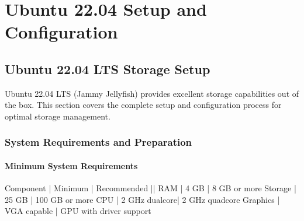 \documentclass[letterpaper,10pt,english]{sphinxmanual}
\begin{document}
\sphinxstepscope


\chapter{Ubuntu 22.04 Setup and Configuration}
\label{\detokenize{ubuntu-setup:ubuntu-22-04-setup-and-configuration}}\label{\detokenize{ubuntu-setup::doc}}

\section{Ubuntu 22.04 LTS Storage Setup}
\label{\detokenize{ubuntu-setup:ubuntu-22-04-lts-storage-setup}}
\sphinxAtStartPar
Ubuntu 22.04 LTS (Jammy Jellyfish) provides excellent storage capabilities out of the box. This section covers the complete setup and configuration process for optimal storage management.


\subsection{System Requirements and Preparation}
\label{\detokenize{ubuntu-setup:system-requirements-and-preparation}}

\subsubsection{Minimum System Requirements}
\label{\detokenize{ubuntu-setup:minimum-system-requirements}}
\begin{sphinxVerbatim}[commandchars=\\\{\}]
Component          | Minimum         | Recommended
\PYGZhy{}\PYGZhy{}\PYGZhy{}\PYGZhy{}\PYGZhy{}\PYGZhy{}\PYGZhy{}\PYGZhy{}\PYGZhy{}\PYGZhy{}\PYGZhy{}\PYGZhy{}\PYGZhy{}\PYGZhy{}\PYGZhy{}\PYGZhy{}\PYGZhy{}\PYGZhy{}\PYGZhy{}|\PYGZhy{}\PYGZhy{}\PYGZhy{}\PYGZhy{}\PYGZhy{}\PYGZhy{}\PYGZhy{}\PYGZhy{}\PYGZhy{}\PYGZhy{}\PYGZhy{}\PYGZhy{}\PYGZhy{}\PYGZhy{}\PYGZhy{}\PYGZhy{}\PYGZhy{}|\PYGZhy{}\PYGZhy{}\PYGZhy{}\PYGZhy{}\PYGZhy{}\PYGZhy{}\PYGZhy{}\PYGZhy{}\PYGZhy{}\PYGZhy{}\PYGZhy{}\PYGZhy{}\PYGZhy{}\PYGZhy{}\PYGZhy{}\PYGZhy{}\PYGZhy{}\PYGZhy{}
RAM                | 4 GB           | 8 GB or more
Storage            | 25 GB          | 100 GB or more
CPU                | 2 GHz dual\PYGZhy{}core| 2 GHz quad\PYGZhy{}core
Graphics           | VGA capable    | GPU with driver support
\end{sphinxVerbatim}
\end{document}
